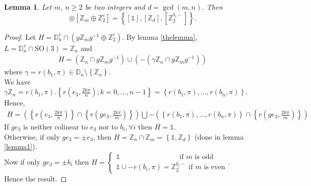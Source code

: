 \documentclass[11pt,a4paper]{amsart}
\newtheorem{lem}[thm]{Lemma}
\theoremstyle{definition}
\newcommand{\ZZ}{\mathbb{Z}}                %
\newcommand{\SO}{\mathrm{SO}}               %
\newcommand{\DD}{\mathbb{D}}                %
\newcommand{\1}{\mathds{1}}		            %
\newcommand{\set}[1]{\left\{#1\right\}}     %
\begin{document}
\begin{lem}
Let $m,\ n \geq 2$ be two integers and $d=\gcd(m,n)$. Then
\begin{equation*}
[\DD_{n}^{v}] \circledcirc [\ZZ_m \oplus \ZZ_2^c]=\set{[\1],[\ZZ_d],[\ZZ_{2}^{b_i-}]}.
\end{equation*}
\end{lem}
\begin{proof}
Let $H=\DD_{n}^v \cap (g\ZZ_m g^{-1} \oplus \ZZ_2^c)$.
By lemma \ref{thelemma}, $L=\DD_{n}^v\cap \SO(3)=\ZZ_n$ and
\begin{align*}
H=(\ZZ_n\cap g \ZZ_m g^{-1})\cup (-(\gamma\ZZ_n\cap g \ZZ_m g^{-1}))
\end{align*}
where $\gamma=r(b_1,\pi)\in \DD_{n}\setminus\set{\ZZ_n}$.\\
We have $\gamma \ZZ_n =r(b_1,\pi).\set{r(e_3,\frac{2k\pi}{n});k=0,\dotsc, n-1}=\set{r(b_1,\pi),\dotsc,r(b_n,\pi)}$.\\
Hence,
\begin{align*}
H=\left(\set{r(e_3,\frac{2k\pi}{n})}\cap \set{r(ge_3,\frac{2k\pi}{m})}\right)\bigcup-\left(\set{r(b_1,\pi),\dotsc,r(b_n,\pi)}\cap \set{r(ge_3,\frac{2k\pi}{m})}\right)
\end{align*}
If $ge_3$ is neither colinear to $e_3$ nor to $b_i,\forall i$ then $H=\1$.\\
Otherwise, if only $ge_3=\pm e_3$, then $H=\ZZ_n\cap\ZZ_m=\set{\1,\ZZ_d}$ (done in lemma \ref{lemma1}).\\
Now if only $ge_3=\pm b_i$ then $H=\begin{cases} \1 \qquad \qquad \qquad \qquad \text{  if } m \text{ is odd} \\ \1\cup -r(b_i,\pi)=\ZZ_2^{b_i-} \text{  if } m \text{ is even} \end{cases}$.\\
Hence the result.
\end{proof}
\end{document}
